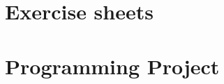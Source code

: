 \section{Exercise sheets}
\blatt

\blatt

\blatt

\blatt

\blatt

\blatt

\blatt

\blatt

\blatt

\blatt

\blatt

\newpage
\section{Programming Project}



